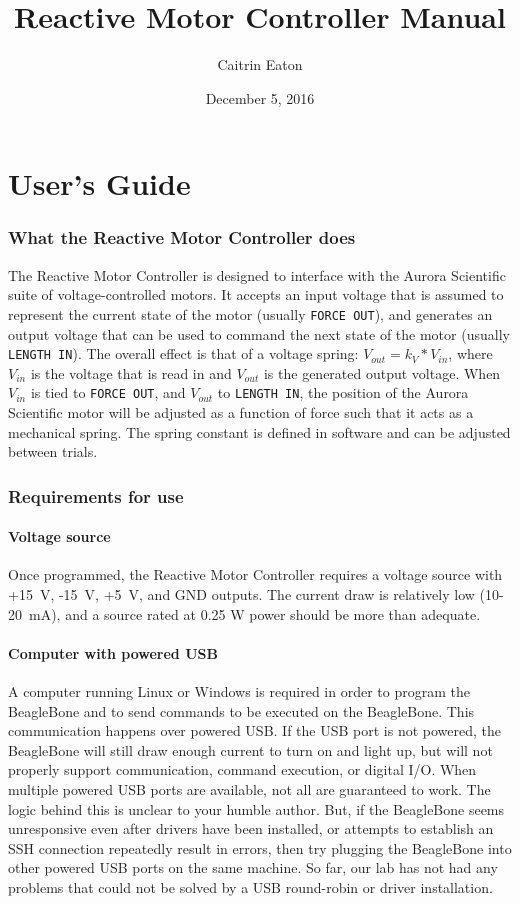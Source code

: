 \documentclass[11pt, letterpaper]{article}
\title{Reactive Motor Controller Manual}
\author{Caitrin Eaton}
\date{December 5, 2016}
\begin{document}
	
\maketitle

\tableofcontents

\newpage
\part{User's Guide}
\section{What the Reactive Motor Controller does}
\label{sec:overview}
The Reactive Motor Controller is designed to interface with the Aurora Scientific suite of voltage-controlled motors. It accepts an input voltage that is assumed to represent the current state of the motor (usually \texttt{FORCE OUT}), and generates an output voltage that can be used to command the next state of the motor (usually \texttt{LENGTH IN}). The overall effect is that of a voltage spring: $V_{out} = k_{V}*V_{in}$, where $V_{in}$ is the voltage that is read in and  $V_{out}$ is the generated output voltage. When $V_{in}$ is tied to \texttt{FORCE OUT}, and $V_{out}$ to \texttt{LENGTH IN}, the position of the Aurora Scientific motor will be adjusted as a function of force such that it acts as a mechanical spring. The spring constant is defined in software and can be adjusted between trials.



\section{Requirements for use}
\label{sec:requirements}

\subsection{Voltage source}
Once programmed, the Reactive Motor Controller requires a voltage source with +15~V, -15~V, +5~V, and GND outputs. The current draw is relatively low (10-20~mA), and a source rated at 0.25 W power should be more than adequate. 

\subsection{Computer with powered USB}
A computer running Linux or Windows is required in order to program the BeagleBone and to send commands to be executed on the BeagleBone. This communication happens over powered USB. If the USB port is not powered, the BeagleBone will still draw enough current to turn on and light up, but will not properly support communication, command execution, or digital I/O. When multiple powered USB ports are available, not all are guaranteed to work. The logic behind this is unclear to your humble author. But, if the BeagleBone seems unresponsive even after drivers have been installed, or attempts to establish an SSH connection repeatedly result in errors, then try plugging the BeagleBone into other powered USB ports on the same machine. So far, our lab has not had any problems that could not be solved by a USB round-robin or driver installation.
\end{document}

